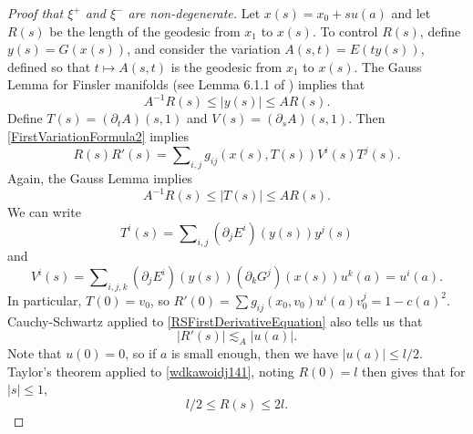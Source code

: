 \begin{proof}[Proof that $\xi^+$ and $\xi^-$ are non-degenerate]
    Let $x(s) = x_0 + s u(a)$ and let $R(s)$ be the length of the geodesic from $x_1$ to $x(s)$. To control $R(s)$, define $y(s) = G(x(s))$, and consider the variation $A(s,t) = E( t y(s) )$, defined so that $t \mapsto A(s,t)$ is the geodesic from $x_1$ to $x(s)$. The Gauss Lemma for Finsler manifolds (see Lemma 6.1.1 of \cite{BaoChern}) implies that
    \begin{equation}
        A^{-1} R(s) \leq |y(s)| \leq A R(s).
    \end{equation}
    Define $T(s) = (\partial_t A)(s,1)$ and $V(s) = (\partial_s A)(s,1)$.
    Then \eqref{FirstVariationFormula2} implies
    \begin{equation} \label{RSFirstDerivativeEquation}
        R(s) R'(s) = \sum\nolimits_{i,j} g_{ij}( x(s), T(s) ) V^i(s) T^j(s).
    \end{equation}
    Again, the Gauss Lemma implies
    \begin{equation} \label{Idiawjdiwaj213123}
        A^{-1} R(s) \leq |T(s)| \leq A R(s).
    \end{equation}
    We can write
    \begin{equation}
        T^i(s) = \sum\nolimits_{i,j} (\partial_j E^i)( y(s)) y^j(s)
    \end{equation}
    and
    \begin{equation}
        V^i(s) = \sum\nolimits_{i,j,k} (\partial_j E^i) (y(s)) (\partial_k G^j)( x(s)) u^k(a) = u^i(a).
    \end{equation}
    In particular, $T(0) = v_0$, so $R'(0) = \sum g_{ij}(x_0, v_0) u^i(a) v_0^j = 1 - c(a)^2$. Cauchy-Schwartz applied to \eqref{RSFirstDerivativeEquation} also tells us that
    \begin{equation} \label{wdkawoidj141}
        |R'(s)| \lesssim_A |u(a)|.
    \end{equation}
    Note that $u(0) = 0$, so if $a$ is small enough, then we have $|u(a)| \leq l/2$. Taylor's theorem applied to \eqref{wdkawoidj141}, noting $R(0) = l$ then gives that for $|s| \leq 1$,
    \begin{equation} \label{RBound}
        l/2 \leq R(s) \leq 2l.
    \end{equation}

\end{proof}
